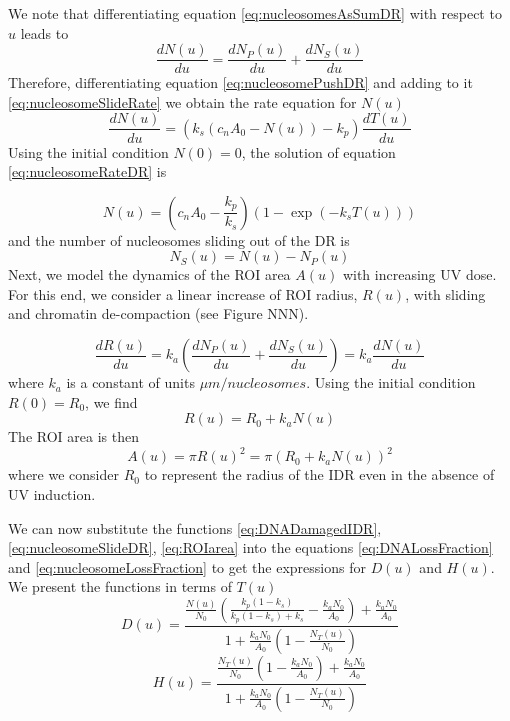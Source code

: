 \documentclass[12pt]{article}
\begin{document}
	We note that differentiating equation \eqref{eq:nucleosomesAsSumDR} with respect to $u$ leads to 
	\begin{equation}
	\frac{dN(u)}{du}=\frac{dN_P(u)}{du} +\frac{dN_S(u)}{du}
	\end{equation}	
	Therefore, differentiating equation \eqref{eq:nucleosomePushDR} and adding to it \eqref{eq:nucleosomeSlideRate} we obtain the rate equation for $N(u)$ 
	\begin{equation}\label{eq:nucleosomeRateDR}
	\frac{dN(u)}{du}= \left(k_s(c_nA_0-N(u))-k_p\right)\frac{dT(u)}{du}
	\end{equation}
	 Using the initial condition $N(0) = 0$, the solution of equation \eqref{eq:nucleosomeRateDR} is 
	 
	\begin{equation}\label{eq:nucleosomeLossDR}
	N(u) = \left(c_nA_0-\frac{k_p}{k_s}\right)\left(1-\exp\left(-k_sT(u)\right)\right)
	\end{equation}	
	and the number of nucleosomes sliding out of the DR is 
	\begin{equation}\label{eq:nucleosomeSlideDR}
	N_S(u) = N(u)-N_P(u)
	\end{equation}
	Next, we model the dynamics of the ROI area $A(u)$ with increasing UV
	dose. For this end, we consider a linear increase of ROI radius, $R(u)$, with sliding and chromatin de-compaction (see Figure NNN). 
		
	\begin{equation*}
	\frac{dR(u)}{du}=k_a\left(\frac{dN_P(u)}{du}+\frac{dN_S(u)}{du}\right)= k_a\frac{dN(u)}{du}
	\end{equation*}
	where $k_a$ is a constant of units $\mu m/ nucleosomes$. Using the initial condition $R(0) = R_0$, we find
	\begin{equation}
	R(u) = R_0+ k_aN(u)
	\end{equation}
	The ROI area is then 
	\begin{equation}\label{eq:ROIarea}
	A(u)= \pi R(u)^2 = \pi (R_0+k_aN(u))^2
	\end{equation}
	where we consider $R_0$ to represent the radius of the IDR even in the absence of UV induction.
	
	We can now substitute the functions \eqref{eq:DNADamagedIDR}, \eqref{eq:nucleosomeSlideDR}, \eqref{eq:ROIarea} into the equations \eqref{eq:DNALossFraction} and \eqref{eq:nucleosomeLossFraction} to get the expressions for $D(u)$ and $H(u)$. We present the functions in terms of $T(u)$
	\begin{equation}\label{eq:DNALoss}
	D(u) = \frac{\frac{N(u)}{N_0}\left(\frac{k_p(1-k_s)}{k_p(1-k_s)+k_s}-\frac{k_aN_0}{A_0}\right)+\frac{k_aN_0}{A_0}}{1+\frac{k_aN_0}{A_0}\left(1-\frac{N_T(u)}{N_0}\right)}
	\end{equation}
	\begin{equation}\label{eq:nucleosomeLoss}
		H(u) = \frac{\frac{N_T(u)}{N_0}\left(1-\frac{k_aN_0}{A_0}\right)+\frac{k_aN_0}{A_0}}{1+\frac{k_aN_0}{A_0}\left(1-\frac{N_T(u)}{N_0}\right)}
	\end{equation}
	
\end{document}
